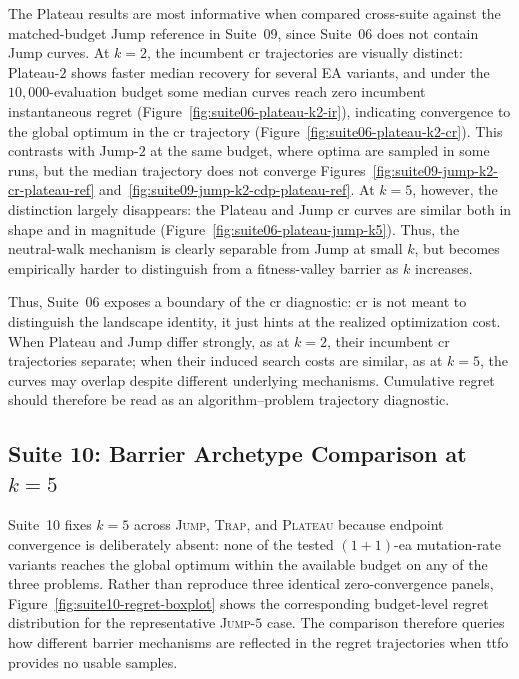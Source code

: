The Plateau results are most informative when compared cross-suite against the
matched-budget Jump reference in Suite~09, since Suite~06 does not
contain Jump curves.
At $k=2$, the incumbent \acrshort{cr} trajectories are visually distinct:
Plateau-$2$ shows faster median recovery for several EA variants, and under the
$10{,}000$-evaluation budget some median curves reach zero incumbent
instantaneous regret (Figure~\ref{fig:suite06-plateau-k2-ir}),
indicating convergence to the global optimum
in the \acrshort{cr} trajectory
(Figure~\ref{fig:suite06-plateau-k2-cr}). This contrasts with
Jump-$2$ at the same budget, where optima are
sampled in some runs, but the median trajectory does not converge
Figures~\ref{fig:suite09-jump-k2-cr-plateau-ref}
and~\ref{fig:suite09-jump-k2-cdp-plateau-ref}. At $k=5$, however, the
distinction largely disappears:
the Plateau and Jump \acrshort{cr} curves are similar both in shape and in
magnitude (Figure~\ref{fig:suite06-plateau-jump-k5}). Thus, the
neutral-walk mechanism is
clearly separable from Jump at small $k$, but becomes empirically harder to
distinguish from a fitness-valley barrier as $k$ increases.

Thus, Suite~06 exposes a boundary of the \acrshort{cr} diagnostic:
\acrshort{cr} is not meant to distinguish the landscape identity, it just
hints at the realized optimization cost.
When Plateau and Jump differ strongly, as at $k=2$, their
incumbent \acrshort{cr} trajectories separate; when their induced search
costs are similar, as at $k=5$, the curves may overlap despite different
underlying mechanisms. Cumulative regret should therefore be read as an
algorithm--problem trajectory diagnostic.

\subsection{Suite 10: Barrier Archetype Comparison at $k=5$}
\label{sec:results:suite10}

Suite~10 fixes $k=5$ across \textsc{Jump}, \textsc{Trap}, and
\textsc{Plateau} because endpoint convergence is deliberately absent:
none of the tested $(1+1)$-\acrshort{ea} mutation-rate variants reaches
the global optimum within the available budget on any of the three
problems. Rather than reproduce three identical zero-convergence panels,
Figure~\ref{fig:suite10-regret-boxplot} shows the corresponding budget-level
regret distribution for the representative \textsc{Jump}-$5$ case.
The comparison therefore queries how different barrier mechanisms are
reflected in the regret trajectories when \acrshort{ttfo} provides no
usable samples.

